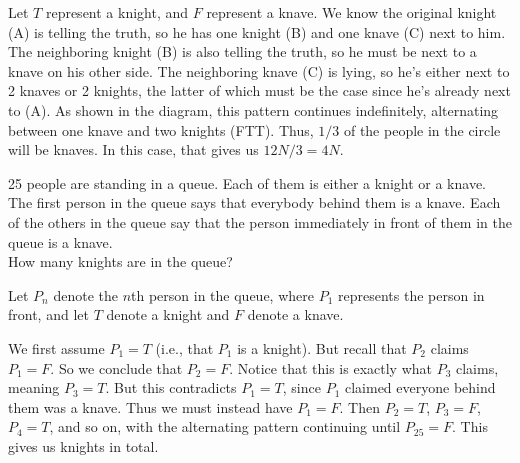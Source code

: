 \begin{solution}[C]
    \begin{minipage}[t]{0.77\textwidth}
\vspace{-8pt}
Let $T$ represent a knight, and $F$ represent a knave. We know the original knight (A) is telling the truth, so he has one knight (B) and one knave (C) next to him. The neighboring knight (B) is also telling the truth, so he must be next to a knave on his other side. The neighboring knave (C) is lying, so he's either next to 2 knaves or 2 knights, the latter of which must be the case since he's already next to (A). As shown in the diagram, this pattern continues indefinitely, alternating between one knave and two knights (FTT). Thus, $1/3$ of the people in the circle will be knaves. In this case, that gives us $12N/3=\boxed{4N}$.
\end{minipage}%
\hfill
\begin{minipage}[t]{0.2\textwidth}
\vspace{-10pt}
\end{minipage}
\end{solution}

 \begin{problem}[Z][3]
    25 people are standing in a queue. Each of them is either a knight or a knave. The first person in the queue says that everybody behind them is a knave. Each of the others in the queue say that the person immediately in front of them in the queue is a knave.\\[\parskip]
    
    How many knights are in the queue?
 \end{problem}

 \begin{solution}[13]
    Let $P_n$ denote the $n$th person in the queue, where $P_1$ represents the person in front, and let $T$ denote a knight and $F$ denote a knave. 

    We first assume $P_1=T$ (i.e., that $P_1$ is a knight). But recall that $P_2$ claims $P_1=F$. So we conclude that $P_2=F$. Notice that this is exactly what $P_3$ claims, meaning $P_3=T$. But this contradicts $P_1=T$, since $P_1$ claimed everyone behind them was a knave. Thus we must instead have $P_1=F$. Then $P_2=T$, $P_3=F$, $P_4=T$, and so on, with the alternating pattern continuing until $P_{25}=F$. This gives us  knights in total.
 \end{solution}

